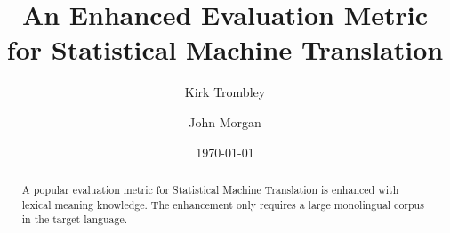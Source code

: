 \documentclass{article}
\title{An Enhanced Evaluation Metric for Statistical Machine Translation}
\author{Kirk Trombley \and John Morgan}
\date{\today}
\begin{document}
\maketitle
\begin{abstract}
A popular evaluation metric for Statistical Machine Translation is enhanced with lexical meaning knowledge. The enhancement only requires a large monolingual corpus in the target language. 
\end{abstract}



\end{document}
